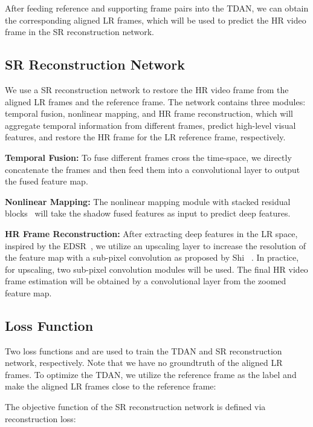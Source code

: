 \documentclass[10pt,twocolumn,letterpaper]{article}
\begin{document}
After feeding  reference and supporting frame pairs into the TDAN, we can obtain the corresponding  aligned LR frames, which will be used to predict the HR video frame  in the SR reconstruction network.

\subsection{SR Reconstruction Network}
\label{recon}

We use a SR reconstruction network to restore the HR video frame   from the aligned LR frames and the reference frame.
The network contains three modules: temporal fusion, nonlinear mapping, and HR frame reconstruction, which will aggregate temporal information from different frames, predict high-level visual features, and restore the HR frame for the LR reference frame, respectively.

\noindent \textbf{Temporal Fusion:} To fuse different frames cross the time-space, we directly concatenate the  frames and then feed them into a  convolutional layer to output the fused feature map.

\noindent \textbf{Nonlinear Mapping:} The nonlinear mapping module with  stacked residual blocks~\cite{lim2017enhanced}  will take the shadow fused features as input to predict deep features.

\noindent \textbf{HR Frame Reconstruction:} After extracting deep features in the LR space, inspired by the EDSR~\cite{lim2017enhanced},  we utilize an upscaling layer to increase the resolution of the feature map with a sub-pixel convolution as proposed by Shi \etal~\cite{shi2016real}. In practice, for  upscaling, two sub-pixel convolution modules will be used. The final HR video frame estimation  will be obtained by a convolutional layer from the zoomed feature map.

\subsection{Loss Function}
\label{loss}

Two loss functions  and  are used to train the TDAN and SR reconstruction network, respectively. Note that we have no groundtruth of the aligned LR frames. To optimize the TDAN, we utilize the reference frame as the label and make the aligned LR frames close to the reference frame:

The objective function of the SR reconstruction network is defined via  reconstruction loss:
\end{document}
